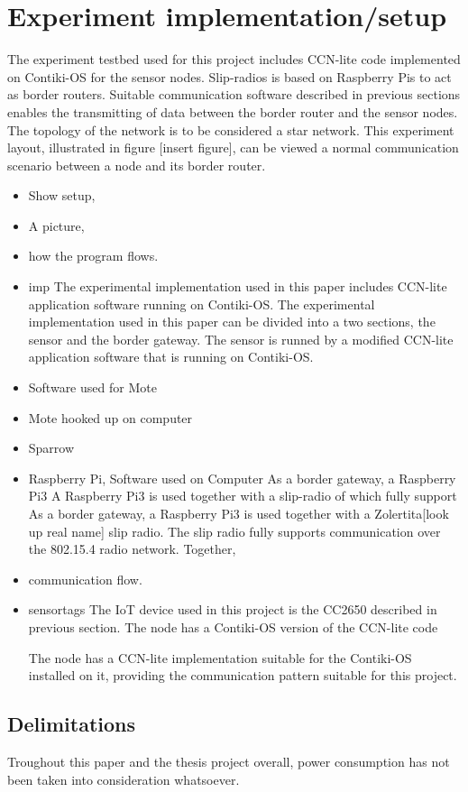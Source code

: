 \section{Experiment implementation/setup}
The experiment testbed used for this project includes CCN-lite code implemented on Contiki-OS for the sensor nodes. Slip-radios is based on Raspberry Pis to act as border routers. Suitable communication software described in previous sections enables the transmitting of data between the border router and the sensor nodes. The topology of the network is to be considered a star network. This experiment layout, illustrated in figure [insert figure], can be viewed a normal communication scenario between a node and its border router.


\begin{itemize}
	\item Show setup,
	\item A picture,
	\item how the program flows.
	\item imp
	The experimental implementation used in this paper includes CCN-lite application software running on Contiki-OS.
	The experimental implementation used in this paper can be divided into a two sections, the sensor and the border gateway.
	The sensor is runned by a modified CCN-lite application software that is running on Contiki-OS. 

	\item Software used for Mote
	\item Mote hooked up on computer
	\item Sparrow
	\item Raspberry Pi, Software used on Computer
	As a border gateway, a Raspberry Pi3 
	A Raspberry Pi3 is used together with a slip-radio of which fully support 
	As a border gateway, a Raspberry Pi3 is used together with a Zolertita[look up real name] slip radio. The slip radio fully supports communication over the 802.15.4 radio network. Together, 

	\item communication flow.


	\item sensortags
	The IoT device used in this project is the CC2650 described in previous section. The node has a Contiki-OS version of the CCN-lite code 

	The node has a CCN-lite implementation suitable for the Contiki-OS installed on it, providing the communication pattern suitable for this project.

\end{itemize}

\subsection{Delimitations}
Troughout this paper and the thesis project overall, power consumption has not been taken into consideration whatsoever. 

